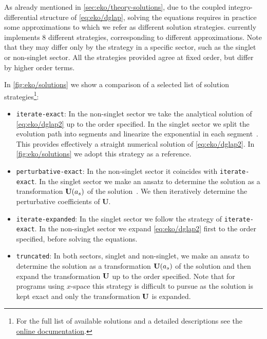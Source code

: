 As already mentioned in \cref{sec:eko/theory-solutions}, due to the coupled
integro-differential structure of \cref{eq:eko/dglap},  solving the equations
requires in practice some approximations to which we refer as different
solution strategies.
\eko{} currently implements 8 different strategies, corresponding to different
approximations.
Note that they may differ only by the strategy in a specific sector, such as
the singlet or non-singlet sector. 
All the strategies provided agree at fixed order, but differ by higher order
terms.

In \cref{fig:eko/solutions} we show a comparison of a selected list of
solution strategies\footnote{
  For the full list of available solutions and a detailed descriptions see the
  \href{https://eko.readthedocs.io/en/latest}{online documentation}.
}:

\begin{itemize}
    \item \texttt{iterate-exact}:
        In the non-singlet sector we take the analytical solution
        of \cref{eq:eko/dglap2} up to the order specified.
        In the singlet sector we split the evolution path into segments
        and linearize the exponential in each segment~\cite{Bonvini:2012sh}.
        This provides effectively a straight numerical solution of \cref{eq:eko/dglap2}.
        In \cref{fig:eko/solutions} we adopt this strategy as a reference.
    \item \texttt{perturbative-exact}:
        In the non-singlet sector it coincides with \texttt{iterate-exact}.
        In the singlet sector we make an ansatz to determine the solution as a
        transformation $\vb{U}(a_s)$ of the \lo{} solution~\cite{Vogt:2004ns}. We then
        iteratively determine the perturbative coefficients of $\textbf{U}$.
    \item \texttt{iterate-expanded}:
        In the singlet sector we follow the strategy of \texttt{iterate-exact}.
        In the non-singlet sector we expand \cref{eq:eko/dglap2} first to the order
        specified, before solving the equations.
    \item \texttt{truncated}: 
        In both sectors, singlet and non-singlet, we make an ansatz to determine the solution as a
        transformation $\vb{U}(a_s)$ of the \lo{} solution and
        then expand the transformation $\vb U$ up to the order specified.
        Note that for programs using $x$-space this strategy is difficult
        to pursue as the \lo{} solution is kept exact and only the transformation
        $\vb U$ is expanded.
\end{itemize}

